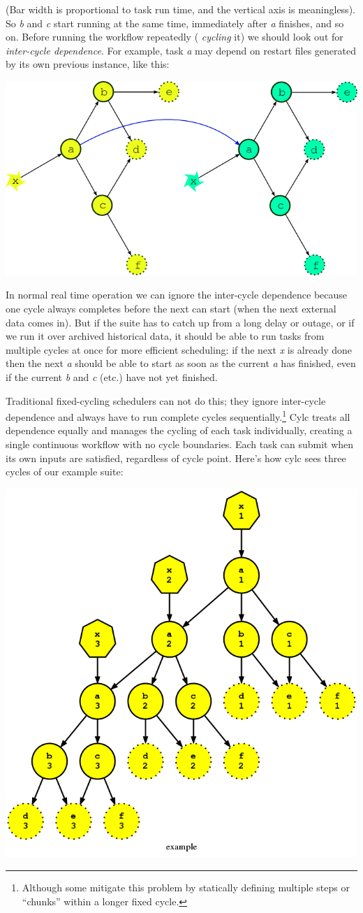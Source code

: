 (Bar width is proportional to task run time, and the vertical axis is
meaningless). So {\em b} and {\em c} start running at the same time, immediately
after {\em a} finishes, and so on. Before running the workflow repeatedly ({\em
cycling} it) we should look out for {\em inter-cycle dependence}.   For
example, task {\em a} may depend on restart files generated by its own previous
instance, like this:

\begin{center}
    \includegraphics[width=0.5\columnwidth]{resources/tex/dep-two-cycles-linked}
\end{center}

In normal real time operation we can ignore the inter-cycle dependence because
one cycle always completes before the next can start (when the next external
data comes in).  But if the suite has to catch up from a long delay or outage,
or if we run it over archived historical data, it should be able to run tasks
from multiple cycles at once for more efficient scheduling: if the next {\em x}
is already done then the next {\em a} should be able to start as soon as the
current {\em a} has finished, even if the current {\em b} and {\em c} (etc.)
have not yet finished.

Traditional fixed-cycling schedulers can not do this; they ignore inter-cycle
dependence and always have to run complete cycles
sequentially.\footnote{Although some mitigate this problem by statically
defining multiple steps or ``chunks'' within a longer fixed cycle.} Cylc
treats all dependence equally and manages the cycling of each task
individually, creating a single continuous workflow with no cycle boundaries.
Each task can submit when its own inputs are satisfied, regardless
of cycle point.  Here's how cylc sees three cycles of our example suite:

\begin{center}
    \includegraphics[width=0.45\columnwidth]{resources/example-3cycles.png}
\end{center}

